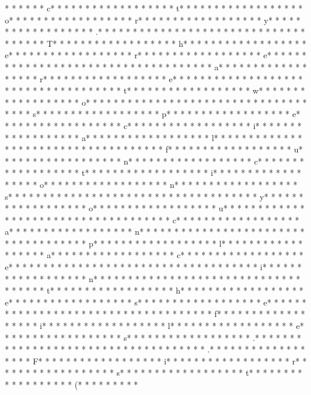 *  *  * * *  * c* * *  * * *  * * *  *  * * *  *  * * *  * t* * *  * * *  * * *  *  * * *  *  * * *  * o* * *  * * *  * * *  *  * * *  *  * * *  * r* * *  * * *  * * *  *  * * *  *  * * *  * y* * *  * * *  * * *  *  * * *  *  * * *  * .* * *  * * *  * * *  *  * * *  *  * * *  *  * * *  * * *  * * *  *  * * *  *  * * *  * T* * *  * * *  * * *  *  * * *  *  * * *  * h* * *  * * *  * * *  *  * * *  *  * * *  * e* * *  * * *  * * *  *  * * *  *  * * *  * r* * *  * * *  * * *  *  * * *  *  * * *  * e* * *  * * *  * * *  *  * * *  *  * * *  *  * * *  * * *  * * *  *  * * *  *  * * *  * a* * *  * * *  * * *  *  * * *  *  * * *  * r* * *  * * *  * * *  *  * * *  *  * * *  * e* * *  * * *  * * *  *  * * *  *  * * *  *  * * *  * * *  * * *  *  * * *  *  * * *  * t* * *  * * *  * * *  *  * * *  *  * * *  * w* * *  * * *  * * *  *  * * *  *  * * *  * o* * *  * * *  * * *  *  * * *  *  * * *  *  * * *  * * *  * * *  *  * * *  *  * * *  * s* * *  * * *  * * *  *  * * *  *  * * *  * p* * *  * * *  * * *  *  * * *  *  * * *  * e* * *  * * *  * * *  *  * * *  *  * * *  * c* * *  * * *  * * *  *  * * *  *  * * *  * i* * *  * * *  * * *  *  * * *  *  * * *  * a* * *  * * *  * * *  *  * * *  *  * * *  * l* * *  * * *  * * *  *  * * *  *  * * *  *  * * *  * * *  * * *  *  * * *  *  * * *  * f* * *  * * *  * * *  *  * * *  *  * * *  * u* * *  * * *  * * *  *  * * *  *  * * *  * n* * *  * * *  * * *  *  * * *  *  * * *  * c* * *  * * *  * * *  *  * * *  *  * * *  * t* * *  * * *  * * *  *  * * *  *  * * *  * i* * *  * * *  * * *  *  * * *  *  * * *  * o* * *  * * *  * * *  *  * * *  *  * * *  * n* * *  * * *  * * *  *  * * *  *  * * *  * s* * *  * * *  * * *  *  * * *  *  * * *  *  * * *  * * *  * * *  *  * * *  *  * * *  * y* * *  * * *  * * *  *  * * *  *  * * *  * o* * *  * * *  * * *  *  * * *  *  * * *  * u* * *  * * *  * * *  *  * * *  *  * * *  *  * * *  * * *  * * *  *  * * *  *  * * *  * c* * *  * * *  * * *  *  * * *  *  * * *  * a* * *  * * *  * * *  *  * * *  *  * * *  * n* * *  * * *  * * *  *  * * *  *  * * *  *  * * *  * * *  * * *  *  * * *  *  * * *  * p* * *  * * *  * * *  *  * * *  *  * * *  * l* * *  * * *  * * *  *  * * *  *  * * *  * a* * *  * * *  * * *  *  * * *  *  * * *  * c* * *  * * *  * * *  *  * * *  *  * * *  * e* * *  * * *  * * *  *  * * *  *  * * *  *  * * *  * * *  * * *  *  * * *  *  * * *  * i* * *  * * *  * * *  *  * * *  *  * * *  * n* * *  * * *  * * *  *  * * *  *  * * *  *  * * *  * * *  * * *  *  * * *  *  * * *  * t* * *  * * *  * * *  *  * * *  *  * * *  * h* * *  * * *  * * *  *  * * *  *  * * *  * e* * *  * * *  * * *  *  * * *  *  * * *  * s* * *  * * *  * * *  *  * * *  *  * * *  * e* * *  * * *  * * *  *  * * *  *  * * *  *  * * *  * * *  * * *  *  * * *  *  * * *  * f* * *  * * *  * * *  *  * * *  *  * * *  * i* * *  * * *  * * *  *  * * *  *  * * *  * l* * *  * * *  * * *  *  * * *  *  * * *  * e* * *  * * *  * * *  *  * * *  *  * * *  * s* * *  * * *  * * *  *  * * *  *  * * *  * .* * *  * * *  * * *  *  * * *  *  * * *  *  * * *  * * *  * * *  *  * * *  *  * * *  * .* * *  * * *  * * *  *  * * *  *  * * *  * F* * *  * * *  * * *  *  * * *  *  * * *  * i* * *  * * *  * * *  *  * * *  *  * * *  * r* * *  * * *  * * *  *  * * *  *  * * *  * s* * *  * * *  * * *  *  * * *  *  * * *  * t* * *  * * *  * * *  *  * * *  *  * * *  * (* * *  * * *  * * * 